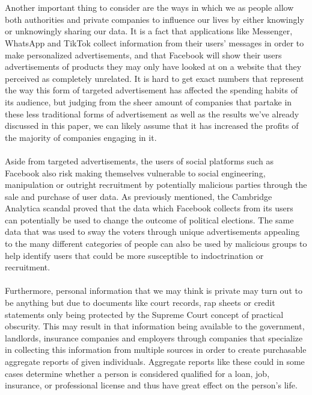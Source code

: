\documentclass[11pt]{article}
\begin{document}
\\ \\
Another important thing to consider are the ways in which we as people allow both authorities and private companies to influence our lives by either knowingly or unknowingly sharing our data. It is a fact that applications like Messenger, WhatsApp and TikTok collect information from their users’ messages in order to make personalized advertisements, and that Facebook will show their users advertisements of products they may only have looked at on a website that they perceived as completely unrelated. It is hard to get exact numbers that represent the way this form of targeted advertisement has affected the spending habits of its audience, but judging from the sheer amount of companies that partake in these less traditional forms of advertisement as well as the results we’ve already discussed in this paper, we can likely assume that it has increased the profits of the majority of companies engaging in it.
\\ \\
Aside from targeted advertisements, the users of social platforms such as Facebook also risk making themselves vulnerable to social engineering, manipulation or outright recruitment by potentially malicious parties through the sale and purchase of user data. As previously mentioned, the Cambridge Analytica scandal proved that the data which Facebook collects from its users can potentially be used to change the outcome of political elections. The same data that was used to sway the voters through unique advertisements appealing to the many different categories of people can also be used by malicious groups to help identify users that could be more susceptible to indoctrination or recruitment. 
\\ \\
Furthermore, personal information that we may think is private may turn out to be anything but due to documents like court records, rap sheets or credit statements only being protected by the Supreme Court concept of practical obscurity. This may result in that information being available to the government, landlords, insurance companies and employers through companies that specialize in collecting this information from multiple sources in order to create purchasable aggregate reports of given individuals. Aggregate reports like these could in some cases determine whether a person is considered qualified for a loan, job, insurance, or professional license and thus have great effect on the person’s life.
\\ \\
\end{document}
